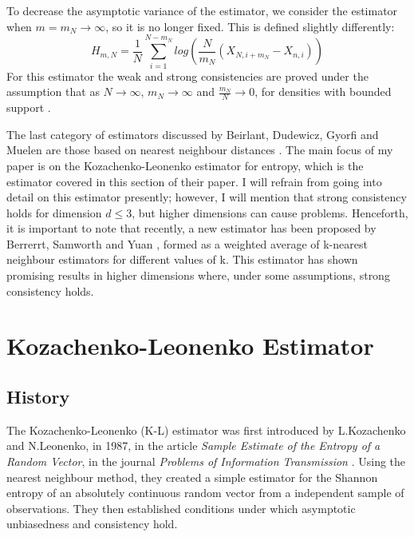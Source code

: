 \documentclass[12pt]{report}
\begin{document}
To decrease the asymptotic variance of the estimator, we consider the estimator when $m = m_{N} \to \infty$, so it is no longer fixed. This is defined slightly differently:
\begin{equation}
H_{m, N} = \frac{1}{N} \sum_{i=1}^{N-m_{N}} log \left(\frac{N}{m_{N}} (X_{N, i+m_{N}} - X_{n, i}) \right)
\end{equation}
For this estimator the weak and strong consistencies are proved under the assumption that as $N \to \infty$, $m_{N} \to \infty$ and $\frac{m_{N}}{N} \to 0$, for densities with bounded support \cite{paper10}.

The last category of estimators discussed by Beirlant, Dudewicz, Gyorfi and Muelen are those based on nearest neighbour distances \cite{paper10}. The main focus of my paper is on the Kozachenko-Leonenko estimator for entropy, which is the estimator covered in this section of their paper. I will refrain from going into detail on this estimator presently; however, I will mention that strong consistency holds for dimension $d \leq 3$, but higher dimensions can cause problems. Henceforth, it is important to note that recently, a new estimator has been proposed by Berrerrt, Samworth and Yuan \cite{paper4}, formed as a weighted average of k-nearest neighbour estimators for different values of k. This estimator has shown promising results in higher dimensions where, under some assumptions, strong consistency holds.






\chapter{Kozachenko-Leonenko Estimator}

\section{History} \label{history}

The Kozachenko-Leonenko (K-L) estimator was first introduced by L.Kozachenko and N.Leonenko, in 1987, in the article \textit{Sample Estimate of the Entropy of a Random Vector}, in the journal \textit{Problems of Information Transmission} \cite{paper1}. Using the nearest neighbour method, they created a simple estimator for the Shannon entropy of an absolutely continuous random vector from a independent sample of observations. They then established conditions under which asymptotic unbiasedness and consistency hold.
\end{document}
